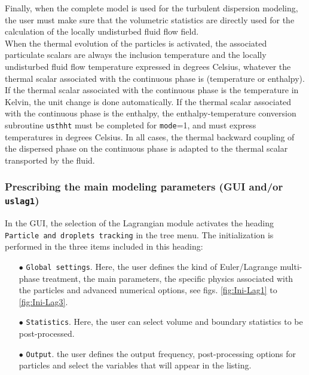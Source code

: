 {{{Finally, when the complete model is used for the turbulent dispersion modeling, the user must make sure that the volumetric statistics are directly used for the calculation of the locally undisturbed fluid flow field.\\ 

When the thermal evolution of the particles is activated, the associated particulate scalars are always the inclusion temperature and the locally
undisturbed fluid flow temperature expressed in degrees Celsius, whatever the thermal scalar associated with the continuous phase is (temperature or enthalpy). If the
thermal scalar associated with the continuous phase is the temperature in Kelvin, the unit change is done automatically. If the thermal scalar associated with the continuous phase is the enthalpy, the enthalpy-temperature conversion subroutine \texttt{usthht} must be completed for \texttt{mode}=1, and must express temperatures in degrees Celsius. In all cases, the thermal backward coupling of the dispersed phase on the continuous phase is adapted to the thermal scalar transported by the fluid.


\subsubsection{Prescribing the main modeling parameters (GUI and/or \texttt{uslag1})}\label{sec:Ini-lag}


In the GUI, the selection of the Lagrangian module activates the heading \texttt{Particle and droplets tracking} in the tree menu. The initialization is performed in the three items included in 
this heading:
%
\begin{itemize}
 \item [$\bullet$] \texttt{Global settings}. Here, the user defines the kind of Euler/Lagrange multi-phase treatment, the main parameters, the specific physics associated with the particles and advanced numerical options, see figs. \ref {fig:Ini-Lag1} to \ref {fig:Ini-Lag3}.
 \item [$\bullet$] \texttt{Statistics}. Here, the user can select volume and boundary statistics to be post-processed.
 \item [$\bullet$] \texttt{Output}. the user defines the output frequency, post-processing options for particles and select the variables that will appear in the listing.
\end{itemize}

}}}
